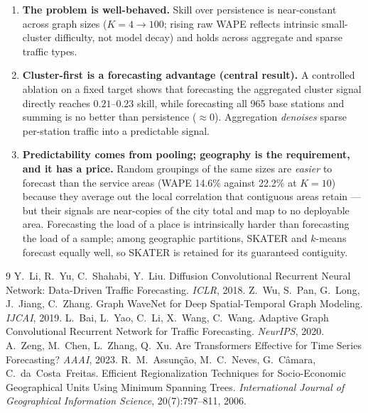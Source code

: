 \begin{enumerate}
  quartile), a consequence of the absolute-error objective and the main opening for improvement.
  \item \textbf{The problem is well-behaved.} Skill over persistence is near-constant across graph sizes
  ($K=4\!\rightarrow\!100$; rising raw WAPE reflects intrinsic small-cluster difficulty, not model decay)
  and holds across aggregate and sparse traffic types.
  \item \textbf{Cluster-first is a forecasting advantage (central result).} A controlled ablation on a
  fixed target shows that forecasting the aggregated cluster signal directly reaches $0.21$--$0.23$ skill,
  while forecasting all 965 base stations and summing is no better than persistence ($\approx 0$).
  Aggregation \emph{denoises} sparse per-station traffic into a predictable signal.
  \item \textbf{Predictability comes from pooling; geography is the requirement, and it has a price.}
  Random groupings of the same sizes are \emph{easier} to forecast than the service areas (WAPE 14.6\%
  against 22.2\% at $K{=}10$) because they average out the local correlation that contiguous areas
  retain --- but their signals are near-copies of the city total and map to no deployable area.
  Forecasting the load of a place is intrinsically harder than forecasting the load of a sample;
  among geographic partitions, SKATER and $k$-means forecast equally well, so SKATER is retained for
  its guaranteed contiguity.
\end{enumerate}

\ifCHFstandalone
\begin{thebibliography}{9}
 Y.~Li, R.~Yu, C.~Shahabi, Y.~Liu.
  Diffusion Convolutional Recurrent Neural Network: Data-Driven Traffic Forecasting.
  \emph{ICLR}, 2018.
 Z.~Wu, S.~Pan, G.~Long, J.~Jiang, C.~Zhang.
  Graph WaveNet for Deep Spatial-Temporal Graph Modeling.
  \emph{IJCAI}, 2019.
 L.~Bai, L.~Yao, C.~Li, X.~Wang, C.~Wang.
  Adaptive Graph Convolutional Recurrent Network for Traffic Forecasting.
  \emph{NeurIPS}, 2020.
 A.~Zeng, M.~Chen, L.~Zhang, Q.~Xu.
  Are Transformers Effective for Time Series Forecasting?
  \emph{AAAI}, 2023.
 R.~M.~Assun\c{c}\~ao, M.~C.~Neves, G.~C\^amara, C.~da~Costa~Freitas.
  Efficient Regionalization Techniques for Socio-Economic Geographical Units Using Minimum Spanning Trees.
  \emph{International Journal of Geographical Information Science}, 20(7):797--811, 2006.
\end{thebibliography}

\fi

